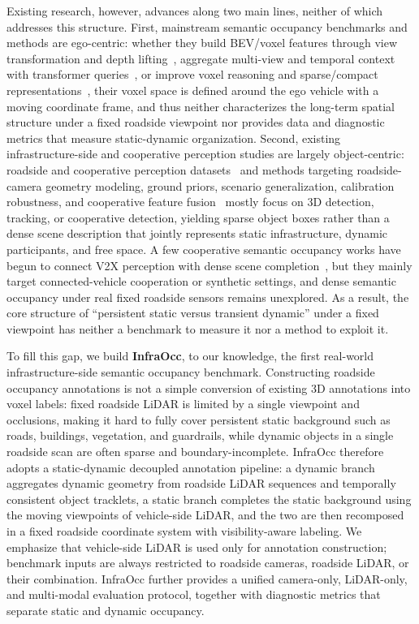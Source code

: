 Existing research, however, advances along two main lines, neither of which
addresses this structure. First, mainstream semantic occupancy benchmarks and
methods are ego-centric: whether they build BEV/voxel features through view
transformation and depth lifting~\cite{BEVDet,BEVDepth}, aggregate multi-view
and temporal context with transformer queries~\cite{BEVFormer,TPVFormer}, or
improve voxel reasoning and sparse/compact
representations~\cite{VoxFormer,OccFormer,SurroundOcc,SparseOcc,GaussianFormer},
their voxel space is defined around the ego vehicle with a moving coordinate
frame, and thus neither characterizes the long-term spatial structure under a
fixed roadside viewpoint nor provides data and diagnostic metrics that measure
static-dynamic organization. Second, existing infrastructure-side and
cooperative perception studies are largely object-centric: roadside and
cooperative perception
datasets~\cite{Rope3D,DAIRV2X,V2XReal,RCooper,TUMTrafV2X,OPV2V,V2XRadar,
zheng2026omnihd} and
methods targeting roadside-camera geometry modeling, ground priors, scenario
generalization, calibration robustness, and cooperative feature
fusion~\cite{BEVHeight,BEVHeightPP,MonoGAE,SGV3D,SIFormer,V2XViT,Where2comm}
mostly focus on 3D detection, tracking, or cooperative detection, yielding
sparse object boxes rather than a dense scene description that jointly
represents static infrastructure, dynamic participants, and free space. A few
cooperative semantic occupancy works have begun to connect V2X perception with
dense scene completion~\cite{CollaborativeSemanticOcc,SyntheticCollaborativeOcc},
but they mainly target connected-vehicle cooperation or synthetic settings, and
dense semantic occupancy under real fixed roadside sensors remains unexplored.
As a result, the core structure of ``persistent static versus transient
dynamic'' under a fixed viewpoint has neither a benchmark to measure it nor a
method to exploit it.

To fill this gap, we build \textbf{InfraOcc}, to our knowledge, the first real-world
infrastructure-side semantic occupancy benchmark. Constructing roadside
occupancy annotations is not a simple conversion of existing 3D annotations into
voxel labels: fixed roadside LiDAR is limited by a single viewpoint and
occlusions, making it hard to fully cover persistent static background such as
roads, buildings, vegetation, and guardrails, while dynamic objects in a single
roadside scan are often sparse and boundary-incomplete. InfraOcc therefore
adopts a static-dynamic decoupled annotation pipeline: a dynamic branch
aggregates dynamic geometry from roadside LiDAR sequences and temporally
consistent object tracklets, a static branch completes the static background
using the moving viewpoints of vehicle-side LiDAR, and the two are then
recomposed in a fixed roadside coordinate system with visibility-aware labeling.
We emphasize that vehicle-side LiDAR is used only for annotation construction;
benchmark inputs are always restricted to roadside cameras, roadside LiDAR, or
their combination. InfraOcc further provides a unified camera-only, LiDAR-only,
and multi-modal evaluation protocol, together with diagnostic metrics that
separate static and dynamic occupancy.

